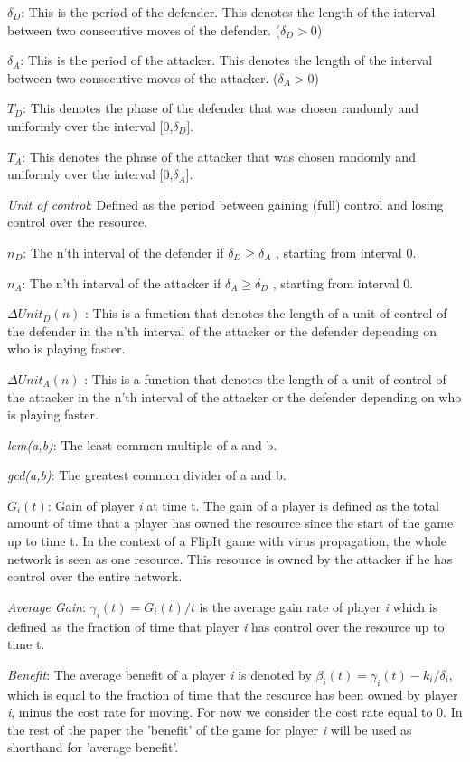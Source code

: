 \begin{description}
\item $\delta_{D}$: This is the period of the defender. This denotes the length of the interval between two consecutive moves of the defender. ($\delta_{D} > 0$)
\item $\delta_{A}$: This is the period of the attacker. This denotes the length of the interval between two consecutive moves of the attacker. ($\delta_{A} > 0$)
\item \textit{$T_{D}$}: This denotes the phase of the defender that was chosen randomly and uniformly over the interval [0,$\delta_{D}$].
\item \textit{$T_{A}$}: This denotes the phase of the attacker that was chosen randomly and uniformly over the interval [0,$\delta_{A}$].
\item \textit{Unit of control}: Defined as the period between gaining (full) control and losing control over the resource.  
\item $n_{D}$: The n'th interval of the defender if $\delta_{D} \geq \delta_{A}$ , starting from interval 0.
\item $n_{A}$: The n'th interval of the attacker if $\delta_{A} \geq \delta_{D}$ , starting from interval 0.
\item $\Delta Unit_{D}(n)$ : This is a function that denotes the length of a unit of control of the defender in the n'th interval of the attacker or the defender depending on who is playing faster.
\item $\Delta Unit_{A}(n)$ : This is a function that denotes the length of a unit of control of the attacker in the n'th interval of the attacker or the defender depending on who is playing faster.
\item \textit{lcm(a,b)}: The least common multiple of a and b.
\item \textit{gcd(a,b)}: The greatest common divider of a and b.
\item $G_{i}(t)$: Gain of player \textit{i} at time t. The gain of a player is defined as the total amount of time that a player has owned the resource since the start of the game up to time t. In the context of a FlipIt game with virus propagation, the whole network is seen as one resource. This resource is owned by the attacker if he has control over the entire network.\\
\item \textit{Average Gain}:  $\gamma_{i}(t) = G_{i}(t)/t$ is the average gain rate of player \textit{i} which is defined as the fraction of time that player \textit{i} has control over the resource up to time t.
\item \textit{Benefit}: The average benefit of a player \textit{i} is denoted by $\beta_{i}(t) = \gamma_{i}(t) - k_{i} / \delta_{i}$, which is equal to the fraction of time that the resource has been owned by player \textit{i}, minus the cost rate for moving. For now we consider the cost rate equal to 0.
In the rest of the paper the 'benefit' of the game for player \textit{i} will be used as shorthand for 'average benefit'.

\end{description}
